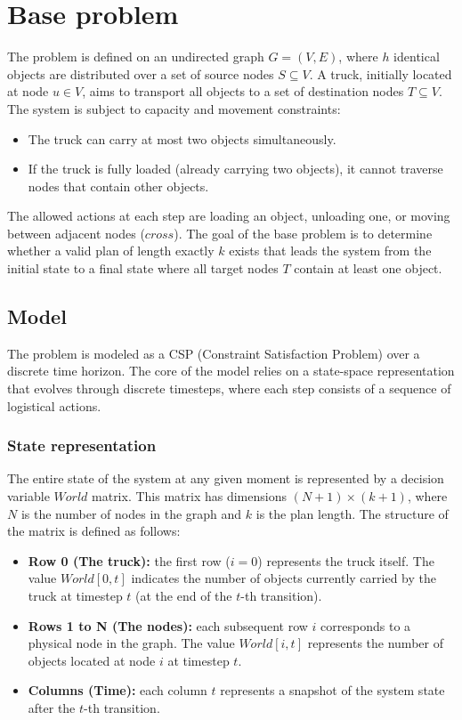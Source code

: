 \documentclass[a4paper,12pt]{article}
\begin{document}
\tableofcontents
\newpage

\section{Base problem}
The problem is defined on an undirected graph $G=(V,E)$, where $h$ identical objects are distributed over a set of source nodes $S \subseteq V$. A truck, initially located at node $u \in V$, aims to transport all objects to a set of destination nodes $T \subseteq V$. The system is subject to capacity and movement constraints:
\begin{itemize}
    \item The truck can carry at most two objects simultaneously.
    \item If the truck is fully loaded (already carrying two objects), it cannot traverse nodes that contain other objects.
\end{itemize}

The allowed actions at each step are loading an object, unloading one, or moving between adjacent nodes ($cross$). The goal of the base problem is to determine whether a valid plan of length exactly $k$ exists that leads the system from the initial state to a final state where all target nodes $T$ contain at least one object.
\subsection{Model}
The problem is modeled as a CSP (Constraint Satisfaction Problem) over a discrete time horizon. The core of the model relies on a state-space representation that evolves through discrete timesteps, where each step consists of a sequence of logistical actions.

\subsubsection{State representation}
The entire state of the system at any given moment is represented by a decision variable $World$ matrix. This matrix has dimensions $(N+1) \times (k+1)$, where $N$ is the number of nodes in the graph and $k$ is the plan length. The structure of the matrix is defined as follows:
\begin{itemize}
    \item \textbf{Row 0 (The truck):} the first row ($i=0$) represents the truck itself. The value $World[0, t]$ indicates the number of objects currently carried by the truck at timestep $t$ (at the end of the $t$-th transition).
    \item \textbf{Rows 1 to N (The nodes):} each subsequent row $i$ corresponds to a physical node in the graph. The value $World[i, t]$ represents the number of objects located at node $i$ at timestep $t$.
    \item \textbf{Columns (Time):} each column $t$ represents a snapshot of the system state after the $t$-th transition.
\end{itemize}
\end{document}
